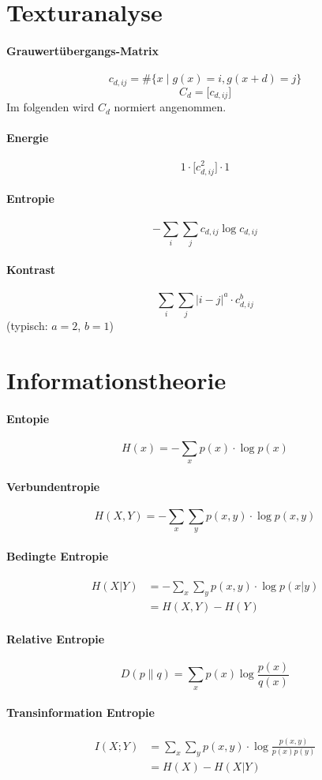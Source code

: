 \documentclass{scrartcl}
\begin{document}
\begin{flushleft}
\begin{multicols}{2}
\section{Texturanalyse}
\paragraph{Grauwertübergangs-Matrix}
\[ c_{d,ij} = \#\{x \mid g(x) = i, g(x+d) = j\} \]
\[ C_d = \big[c_{d,ij}\big]\]
Im folgenden wird $C_d$ normiert angenommen.
\paragraph{Energie}
\[ 1\cdot\big[c_{d,ij}^2\big]\cdot1\]
\paragraph{Entropie}
\[ -\sum_i \sum_j c_{d,ij} \log c_{d,ij} \]
\paragraph{Kontrast}
\[ \sum_i \sum_j |i-j|^a\cdot c_{d,ij}^b \]
(typisch: $a=2$, $b=1$)

\section{Informationstheorie}
\paragraph{Entopie}
\[H(x) = -\sum_x p(x) \cdot \log p(x) \]
\paragraph{Verbundentropie}
\[H(X,Y) = -\sum_x\sum_y p(x,y) \cdot \log p(x,y) \]
\paragraph{Bedingte Entropie}
\begin{align*}
H(X|Y) &= -\sum_x\sum_y p(x,y) \cdot \log p(x|y) \\
       &= H(X,Y) - H(Y)
\end{align*}
\paragraph{Relative Entropie}
\[ D(p\|q) = \sum_x p(x) \log \frac{p(x)}{q(x)} \]
\paragraph{Transinformation Entropie}
\begin{align*}
I(X;Y) &= \sum_x\sum_y p(x,y) \cdot \log \frac{p(x,y)}{p(x)p(y)} \\
       &= H(X) - H(X|Y)
\end{align*}


\end{multicols}
\end{flushleft}
\end{document}

